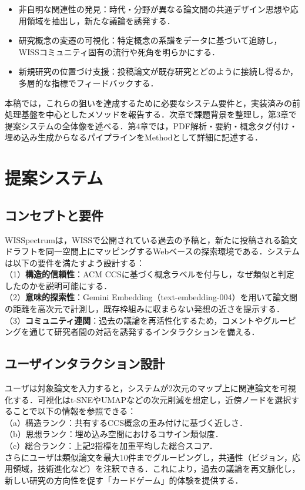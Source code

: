 \documentclass[twoside]{wiss}
\begin{document}
\begin{itemize}
 \item 非自明な関連性の発見：時代・分野が異なる論文間の共通デザイン思想や応用領域を抽出し，新たな議論を誘発する．
 \item 研究概念の変遷の可視化：特定概念の系譜をデータに基づいて追跡し，WISSコミュニティ固有の流行や死角を明らかにする．
 \item 新規研究の位置づけ支援：投稿論文が既存研究とどのように接続し得るか，多層的な指標でフィードバックする．
\end{itemize}
本稿では，これらの狙いを達成するために必要なシステム要件と，実装済みの前処理基盤を中心としたメソッドを報告する．次章で課題背景を整理し，第3章で提案システムの全体像を述べる．第4章では，PDF解析・要約・概念タグ付け・埋め込み生成からなるパイプラインをMethodとして詳細に記述する．



\section{提案システム}

\subsection{コンセプトと要件}
WISSpectrumは，WISSで公開されている過去の予稿と，新たに投稿される論文ドラフトを同一空間上にマッピングするWebベースの探索環境である．システムは以下の要件を満たすよう設計する：\\
（1）\textbf{構造的信頼性}：ACM CCSに基づく概念ラベルを付与し，なぜ類似と判定したのかを説明可能にする．\\
（2）\textbf{意味的探索性}：Gemini Embedding（text-embedding-004）を用いて論文間の距離を高次元で計測し，既存枠組みに収まらない発想の近さを提示する．\\
（3）\textbf{コミュニティ連関}：過去の議論を再活性化するため，コメントやグルーピングを通じて研究者間の対話を誘発するインタラクションを備える．

\subsection{ユーザインタラクション設計}
ユーザは対象論文を入力すると，システムが2次元のマップ上に関連論文を可視化する．可視化はt-SNEやUMAPなどの次元削減を想定し，近傍ノードを選択することで以下の情報を参照できる：\\
（a）構造ランク：共有するCCS概念の重み付けに基づく近しさ．\\
（b）思想ランク：埋め込み空間におけるコサイン類似度．\\
（c）総合ランク：上記2指標を加重平均した総合スコア．\\
さらにユーザは類似論文を最大10件までグルーピングし，共通性（ビジョン，応用領域，技術進化など）を注釈できる．これにより，過去の議論を再文脈化し，新しい研究の方向性を促す「カードゲーム」的体験を提供する．
\end{document}
